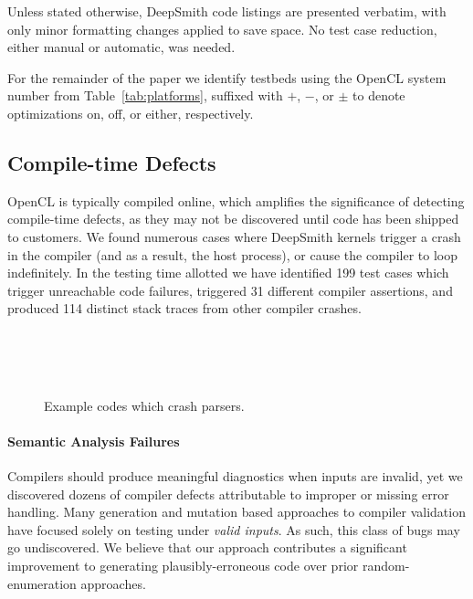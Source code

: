 Unless stated otherwise, DeepSmith code listings are presented verbatim, with
only minor formatting changes applied to save space. No test case reduction,
either manual or automatic, was needed.

For the remainder of the paper we identify testbeds using the OpenCL system
number from Table~\ref{tab:platforms}, suffixed with $+$, $-$, or $\pm$ to
denote optimizations on, off, or either, respectively.

\subsection{Compile-time Defects}%
\label{subsec:compile-time-defects}

OpenCL is typically compiled online, which amplifies the significance of
detecting compile-time defects, as they may not be discovered until code has
been shipped to customers. We found numerous cases where DeepSmith kernels
trigger a crash in the compiler (and as a result, the host process), or cause
the compiler to loop indefinitely. In the testing time allotted we have
identified 199 test cases which trigger unreachable code failures, triggered 31
different compiler assertions, and produced 114 distinct stack traces from other
compiler crashes.

\begin{figure}
  \centering %
  \\%
  \\%
  \\%
  \caption{Example codes which crash parsers.}%
  \vspace{-1.1em}
  \label{lst:parser-crashes}
\end{figure}

\paragraph{Semantic Analysis Failures}

Compilers should produce meaningful diagnostics when inputs are invalid, yet we
discovered dozens of compiler defects attributable to improper or missing error
handling. Many generation and mutation based approaches to compiler validation
have focused solely on testing under \emph{valid inputs}. As such, this class of
bugs may go undiscovered. We believe that our approach contributes a significant
improvement to generating plausibly-erroneous code over prior random-enumeration
approaches.

